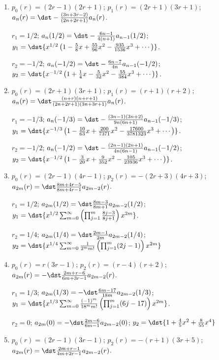 \documentclass[openany]{book}
\newenvironment{sectionSolutions}{
 \begin{enumerate}[item-label={\thesection.\arabic{enumi}.}]
}{
 \end{enumerate}
}
\begin{document}
\begin{sectionSolutions}
$r_2=1/4$;
$a_n(1/4)=\dst-\frac{16n^2+8n+1}{32n(4n-1)} a_{n-1}(1/4)$;
$y_2=\dst{x^{1/4}\left(1-\frac{25}{96}x+\frac{675}{14336}x^2-
\frac{38025}{5046272}x^3
+\cdots\right)}$.


\item
$p_0(r)=(2r-1)(2r+1)$;
$p_1(r)=(2r+1)(3r+1)$;
$a_n(r)=\dst-\frac{(3n+3r-2)}{(2n+2r+1)} a_n(r)$.

$r_1=1/2$;
$a_n(1/2)=\dst-\frac{6n-1}{4(n+1)} a_{n-1}(1/2)$;
$y_1=\dst{x^{1/2}\left(1-\frac{5}{8}x+\frac{55}{96}x^2
-\frac{935}{1536}x^3+\cdots\right)}$.

$r_2=-1/2$;
$a_n(-1/2)=\dst-\frac{6n-7}{4n} a_{n-1}(-1/2)$;
$y_2=\dst{x^{-1/2}\left(1+\frac{1}{4}x-\frac{5}{32}x^2
-\frac{55}{384}x^3+\cdots\right)}$.


\item
$p_0(r)=(2r+1)(3r+1)$;
$p_1(r)=(r+1)(r+2)$;
$a_n(r)=\dst\frac{(n+r)(n+r+1)}{(2n+2r+1)(3n+3r+1)} a_n(r)$.

$r_1=-1/3$;
$a_n(-1/3)=\dst-\frac{(3n-1)(3n+2)}{9n(6n+1)}a_{n-1}(-1/3)$;
$y_1=\dst{x^{-1/3}\left(1-\frac{10}{63}x+\frac{200}{7371}x^2-
\frac{17600}{3781323}x^3
+\cdots\right)}$.

$r_2=-1/2$;
$a_n(-1/2)=\dst-\frac{(2n-1)(2n+1)}{4n(6n-1)} a_{n-1}(-1/2)$;
$y_2=\dst{x^{-1/2}\left(1-\frac{3}{20}x+\frac{9}{352}x^2
-\frac{105}{23936}x^3
+\cdots\right)}$.



\item
$p_0(r)=(2r-1)(4r-1)$;
$p_2(r)=-(2r+3)(4r+3)$;
$a_{2m}(r)=\dst\frac{8m+4r-5}{8m+4r-1}a_{2m-2}(r)$.

$r_1=1/2$;
$a_{2m}(1/2)=\dst\frac{8m-3}{8m+1}a_{2m-2}(1/2)$;
$y_1=\dst{x^{1/2}\sum_{m=0}^\infty\left(\prod_{j=1}^m\frac{8j-3}{8j+
1}\right)x^{2m}}$.

$r_2=1/4$;
$a_{2m}(1/4)=\dst\frac{2m-1}{2m}a_{2m-2}(1/4)$;
$y_2=\dst{x^{1/4}\sum_{m=0}^\infty\frac{1}{2^mm!}\left(\prod_{j=1}^m(2j-1)
\right)x^{2m}}$

\item
$p_0(r)=r(3r-1)$;
$p_2(r)=(r-4)(r+2)$;
$a_{2m}(r)=-\dst\frac{2m+r-6}{6m+3r-1}a_{2m-2}(r)$.

$r_1=1/3$;
$a_{2m}(1/3)=-\dst\frac{6m-17}{18m}a_{2m-2}(1/3)$;
$y_1=\dst{x^{1/3}\sum_{m=0}^\infty\frac{(-1)^m}{18^mm!}\left(\prod_{j=1}^m
(6j-17)\right) x^{2m}}$.

$r_2=0$;
$a_{2m}(0)=-\dst\frac{2m-6}{6m-1}a_{2m-2}(0)$;
$y_2=\dst{1+\frac{4}{5}x^2+\frac{8}{55}x^4}$


\item
$p_0(r)=(2r-1)(3r-1)$;
$p_2(r)=-(r+1)(3r+5)$;
$a_{2m}(r)=\dst\frac{2m+r-1}{4m+2r-1}a_{2m-2}(r)$.


\end{sectionSolutions}
\end{document}

